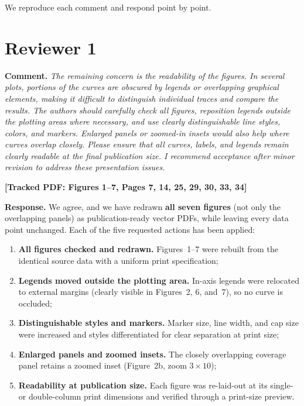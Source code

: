 \documentclass[11pt]{article}
\newcommand{\loc}[1]{\textbf{[\textcolor{revblue}{Tracked PDF: #1}]}}
\begin{document}
We reproduce each comment and respond point by point.

\section*{Reviewer 1}

\textbf{Comment.} \textit{The remaining concern is the readability of the
figures. In several plots, portions of the curves are obscured by legends or
overlapping graphical elements, making it difficult to distinguish individual
traces and compare the results. The authors should carefully check all
figures, reposition legends outside the plotting areas where necessary, and use
clearly distinguishable line styles, colors, and markers. Enlarged panels or
zoomed-in insets would also help where curves overlap closely. Please ensure
that all curves, labels, and legends remain clearly readable at the final
publication size. I recommend acceptance after minor revision to address these
presentation issues.}

\loc{Figures 1--7, Pages 7, 14, 25, 29, 30, 33, 34}

\textbf{Response.} We agree, and we have redrawn \textbf{all seven figures}
(not only the overlapping panels) as publication-ready vector PDFs, while
leaving every data point unchanged. Each of the five requested actions has
been applied:

\begin{enumerate}[label=(\arabic*)]
\item \textbf{All figures checked and redrawn.} Figures~1--7 were rebuilt
from the identical source data with a uniform print specification;
\item \textbf{Legends moved outside the plotting area.} In-axis legends were
relocated to external margins (clearly visible in Figures~2, 6, and~7), so no
curve is occluded;
\item \textbf{Distinguishable styles and markers.} Marker size, line width,
and cap size were increased and styles differentiated for clear separation at
print size;
\item \textbf{Enlarged panels and zoomed insets.} The closely overlapping
coverage panel retains a zoomed inset (Figure~2b, zoom $3\times10$);
\item \textbf{Readability at publication size.} Each figure was re-laid-out at
its single- or double-column print dimensions and verified through a
print-size preview.
\end{enumerate}
\end{document}
